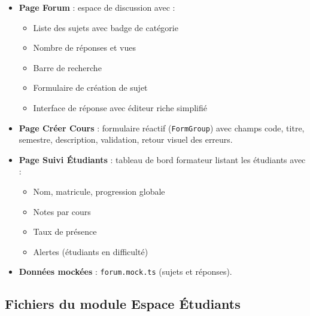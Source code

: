 \documentclass[a4paper,12pt,french]{article}
\begin{document}
\begin{itemize}
    \item \textbf{Page Forum} : espace de discussion avec :
    \begin{itemize}
        \item Liste des sujets avec badge de catégorie
        \item Nombre de réponses et vues
        \item Barre de recherche
        \item Formulaire de création de sujet
        \item Interface de réponse avec éditeur riche simplifié
    \end{itemize}
    \item \textbf{Page Créer Cours} : formulaire réactif (\texttt{FormGroup}) avec champs code, titre, semestre, description, validation, retour visuel des erreurs.
    \item \textbf{Page Suivi Étudiants} : tableau de bord formateur listant les étudiants avec :
    \begin{itemize}
        \item Nom, matricule, progression globale
        \item Notes par cours
        \item Taux de présence
        \item Alertes (étudiants en difficulté)
    \end{itemize}
    \item \textbf{Données mockées} : \texttt{forum.mock.ts} (sujets et réponses).
\end{itemize}

\subsection{Fichiers du module Espace Étudiants}
\end{document}
